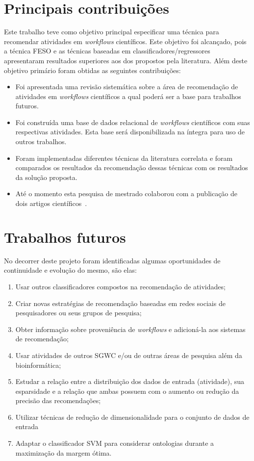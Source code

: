 \section{Principais contribuições}
Este trabalho teve como objetivo principal especificar uma técnica para recomendar atividades em \emph{workflows} científicos. Este objetivo foi alcançado, pois a técnica FESO e as técnicas baseadas em classificadores/regressores apresentaram resultados superiores aos dos propostos pela literatura. Além deste objetivo primário foram obtidas as seguintes contribuições:
\begin{itemize}
\item Foi apresentada uma revisão sistemática sobre a área de recomendação de atividades em \emph{workflows} científicos a qual poderá ser a base para trabalhos futuros.
\item Foi construída uma base de dados relacional de \emph{workflows} científicos com suas respectivas atividades. Esta base será disponibilizada na íntegra para uso de outros trabalhos.
\item Foram implementadas diferentes técnicas da literatura correlata e foram comparados os resultados da recomendação dessas técnicas com os resultados da solução proposta.
\item Até o momento esta pesquisa de mestrado colaborou com a publicação de dois artigos científicos~\cite{Khouri2015,DigiampietriEtAl2015}.
\end{itemize}

\section{Trabalhos futuros}
No decorrer deste projeto foram identificadas algumas oportunidades de continuidade e evolução do mesmo, são elas:
\begin{enumerate}
\item Usar outros classificadores compostos na recomendação de atividades;
\item Criar novas estratégias de recomendação baseadas em redes sociais de pesquisadores ou seus grupos de pesquisa;
\item Obter informação sobre proveniência de \emph{workflows} e adicioná-la aos sistemas de recomendação;
\item Usar atividades de outros SGWC e/ou de outras áreas de pesquisa além da bioinformática;
\item Estudar a relação entre a distribuição dos dados de entrada (atividade), sua esparsidade e a relação que ambas possuem com o aumento ou redução da precisão das recomendações;
\item Utilizar técnicas de redução de dimensionalidade para o conjunto de dados de entrada
\item Adaptar o classificador SVM para considerar ontologias durante a maximização da margem ótima.
\end{enumerate}

